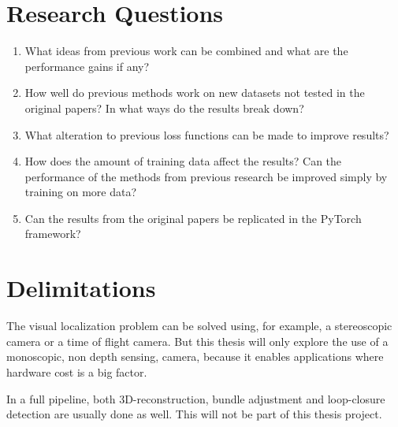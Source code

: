 \section{Research Questions}

\begin{enumerate}
	
	\item What ideas from previous work can be combined and what are the performance gains if any?
	\item How well do previous methods work on new datasets not tested in the original papers? In what ways do the results break down?
	\item What alteration to previous loss functions can be made to improve results?
	\item How does the amount of training data affect the results? Can the performance of the methods from previous research be improved simply by training on more data?
	\item Can the results from the original papers be replicated in the PyTorch framework?
	
\end{enumerate}

\section{Delimitations}

The visual localization problem can be solved using, for example, a stereoscopic camera or a time of flight camera. But this thesis will only explore the use of a monoscopic, non depth sensing, \abbrRGB camera, because it enables applications where hardware cost is a big factor.

In a full \abbrSFM pipeline, both 3D-reconstruction, bundle adjustment and loop-closure detection are usually done as well. This will not be part of this thesis project.